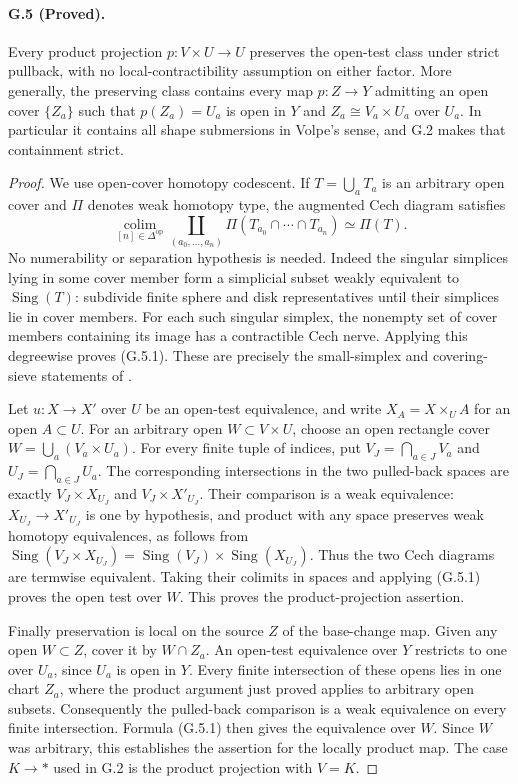 \paragraph{G.5 (Proved).}
Every product projection $p:V\times U\to U$ preserves the
open-test class under strict pullback, with no local-contractibility
assumption on either factor. More generally, the preserving class
contains every map $p:Z\to Y$ admitting an open cover $\{Z_a\}$
such that $p(Z_a)=U_a$ is open in $Y$ and
$Z_a\cong V_a\times U_a$ over $U_a$. In particular it contains
all shape submersions in Volpe's sense, and G.2 makes that
containment strict.
\begin{proof}
We use open-cover homotopy codescent. If $T=\bigcup_a T_a$ is
an arbitrary open cover and $\Pi$ denotes weak homotopy type,
the augmented Cech diagram satisfies
\[
 \operatorname*{colim}_{[n]\in\Delta^{\mathrm{op}}}
 \coprod_{(a_0,\ldots,a_n)}
 \Pi(T_{a_0}\cap\cdots\cap T_{a_n})
 \simeq\Pi(T).
 \tag{G.5.1}
\]
No numerability or separation hypothesis is needed. Indeed the
singular simplices lying in some cover member form a simplicial
subset weakly equivalent to $\operatorname{Sing}(T)$:
subdivide finite sphere and disk representatives until their
simplices lie in cover members. For each such singular simplex,
the nonempty set of cover members containing its image has a
contractible Cech nerve. Applying this degreewise proves
(G.5.1). These are precisely the small-simplex and covering-sieve
statements of \citet[Lemma A.3.3 and Proposition A.3.2]{GHIJLurie2017}.

Let $u:X\to X'$ over $U$ be an open-test equivalence, and
write $X_A=X\times_U A$ for an open $A\subset U$.
For an arbitrary open $W\subset V\times U$, choose an open
rectangle cover
$W=\bigcup_a(V_a\times U_a)$.
For every finite tuple of indices, put
$V_J=\bigcap_{a\in J}V_a$ and $U_J=\bigcap_{a\in J}U_a$.
The corresponding intersections in the two pulled-back spaces
are exactly $V_J\times X_{U_J}$ and
$V_J\times X'_{U_J}$. Their comparison is a weak equivalence:
$X_{U_J}\to X'_{U_J}$ is one by hypothesis, and product with
any space preserves weak homotopy equivalences, as follows from
$\operatorname{Sing}(V_J\times X_{U_J})
=\operatorname{Sing}(V_J)\times\operatorname{Sing}(X_{U_J})$.
Thus the two Cech diagrams are termwise equivalent. Taking their
colimits in spaces and applying (G.5.1) proves the open test over
$W$. This proves the product-projection assertion.

Finally preservation is local on the source $Z$ of the base-change
map. Given any open $W\subset Z$, cover it by $W\cap Z_a$.
An open-test equivalence over $Y$ restricts to one over $U_a$,
since $U_a$ is open in $Y$.
Every finite intersection of these opens lies in one chart $Z_a$,
where the product argument just proved applies to arbitrary open
subsets. Consequently the pulled-back comparison is a weak
equivalence on every finite intersection. Formula (G.5.1) then
gives the equivalence over $W$. Since $W$ was arbitrary, this
establishes the assertion for the locally product map. The case
$K\to *$ used in G.2 is the product projection with $V=K$.
\end{proof}
